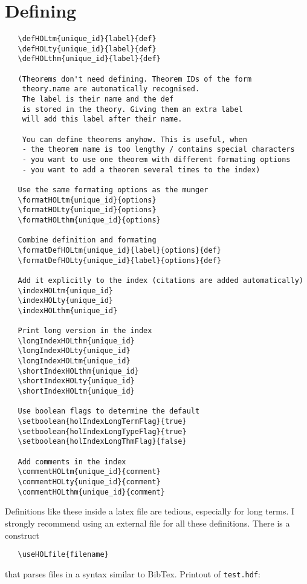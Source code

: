 \documentclass{article}
\begin{document}
\section{Defining}
\begin{verbatim}
   \defHOLtm{unique_id}{label}{def}
   \defHOLty{unique_id}{label}{def}
   \defHOLthm{unique_id}{label}{def}

   (Theorems don't need defining. Theorem IDs of the form
    theory.name are automatically recognised.
    The label is their name and the def
    is stored in the theory. Giving them an extra label
    will add this label after their name.

    You can define theorems anyhow. This is useful, when
    - the theorem name is too lengthy / contains special characters
    - you want to use one theorem with different formating options
    - you want to add a theorem several times to the index)

   Use the same formating options as the munger
   \formatHOLtm{unique_id}{options}
   \formatHOLty{unique_id}{options}
   \formatHOLthm{unique_id}{options}

   Combine definition and formating
   \formatDefHOLtm{unique_id}{label}{options}{def}
   \formatDefHOLty{unique_id}{label}{options}{def}

   Add it explicitly to the index (citations are added automatically)
   \indexHOLtm{unique_id}
   \indexHOLty{unique_id}
   \indexHOLthm{unique_id}

   Print long version in the index
   \longIndexHOLthm{unique_id}
   \longIndexHOLty{unique_id}
   \longIndexHOLtm{unique_id}
   \shortIndexHOLthm{unique_id}
   \shortIndexHOLty{unique_id}
   \shortIndexHOLtm{unique_id}

   Use boolean flags to determine the default
   \setboolean{holIndexLongTermFlag}{true}
   \setboolean{holIndexLongTypeFlag}{true}
   \setboolean{holIndexLongThmFlag}{false}

   Add comments in the index
   \commentHOLtm{unique_id}{comment}
   \commentHOLty{unique_id}{comment}
   \commentHOLthm{unique_id}{comment}
\end{verbatim}
%
Definitions like these inside a latex file are tedious,
especially for long terms. I strongly recommend using
an external file for all these definitions. There
is a construct
\begin{verbatim}
   \useHOLfile{filename}
\end{verbatim}
that parses files in a syntax similar to BibTex.
Printout of \texttt{test.hdf}:
\end{document}

